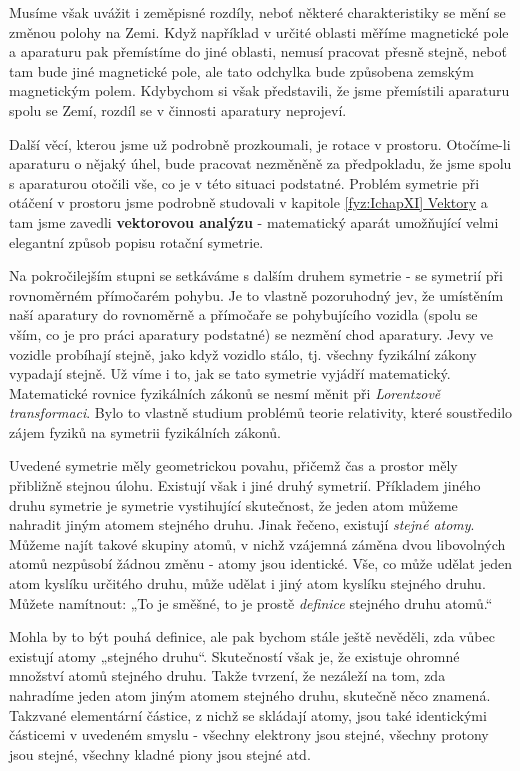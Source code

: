     Musíme však uvážit i zeměpisné rozdíly, neboť některé charakteristiky se mění se změnou polohy
    na Zemi. Když například v určité oblasti měříme magnetické pole a aparaturu pak přemístíme do
    jiné oblasti, nemusí pracovat přesně stejně, neboť tam bude jiné magnetické pole, ale tato
    odchylka bude způsobena zemským magnetickým polem. Kdybychom si však představili, že jsme
    přemístili aparaturu spolu se Zemí, rozdíl se v činnosti aparatury neprojeví.

    Další věcí, kterou jsme už podrobně prozkoumali, je rotace v prostoru. Otočíme-li aparaturu o
    nějaký úhel, bude pracovat nezměněně za předpokladu, že jsme spolu s aparaturou otočili vše, co
    je v této situaci podstatné. Problém symetrie při otáčení v prostoru jsme podrobně studovali v
    kapitole \hyperref[fyz:IchapXI]{\ref*{fyz:IchapXI} Vektory} a tam jsme zavedli
    \textbf{vektorovou analýzu} - matematický aparát umožňující velmi elegantní způsob popisu
    rotační symetrie.

    Na pokročilejším stupni se setkáváme s dalším druhem symetrie - se symetrií při rovnoměrném
    přímočarém pohybu. Je to vlastně pozoruhodný jev, že umístěním naší aparatury do rovnoměrně a
    přímočaře se pohybujícího vozidla (spolu se vším, co je pro práci aparatury podstatné) se
    nezmění chod aparatury. Jevy ve vozidle probíhají stejně, jako když vozidlo stálo, tj. všechny
    fyzikální zákony vypadají stejně. Už víme i to, jak se tato symetrie vyjádří matematický.
    Matematické rovnice fyzikálních zákonů se nesmí měnit při \emph{Lorentzově transformaci}. Bylo
    to vlastně studium problémů teorie relativity, které soustředilo zájem fyziků na symetrii
    fyzikálních zákonů.

    Uvedené symetrie měly geometrickou povahu, přičemž čas a prostor měly přibližně stejnou úlohu.
    Existují však i jiné druhý symetrií. Příkladem jiného druhu symetrie je symetrie vystihující
    skutečnost, že jeden atom můžeme nahradit jiným atomem stejného druhu. Jinak řečeno, existují
    \emph{stejné atomy}. Můžeme najít takové skupiny atomů, v nichž vzájemná záměna dvou libovolných
    atomů nezpůsobí žádnou změnu - atomy jsou identické. Vše, co může udělat jeden atom kyslíku
    určitého druhu, může udělat i jiný atom kyslíku stejného druhu. Můžete namítnout: „To je směšné,
    to je prostě \emph{deﬁnice} stejného druhu atomů.“

    Mohla by to být pouhá deﬁnice, ale pak bychom stále ještě nevěděli, zda vůbec existují atomy
    „stejného druhu“. Skutečností však je, že existuje ohromné množství atomů stejného druhu. Takže
    tvrzení, že nezáleží na tom, zda nahradíme jeden atom jiným atomem stejného druhu, skutečně něco
    znamená. Takzvané elementární částice, z nichž se skládají atomy, jsou také identickými
    částicemi v uvedeném smyslu - všechny elektrony jsou stejné, všechny protony jsou stejné,
    všechny kladné piony jsou stejné atd.

